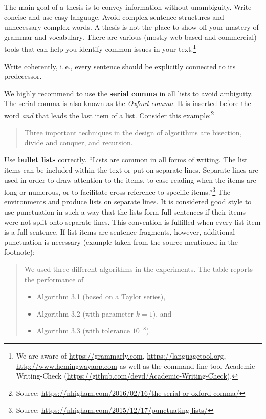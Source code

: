 The main goal of a thesis is to convey information without unambiguity. Write concise and use easy language. Avoid complex sentence structures and unnecessary complex words. A thesis is not the place to show off your mastery of grammar and vocabulary. There are various (mostly web-based and commercial) tools that can help you identify common issues in your text.\footnote{We are aware of \url{https://grammarly.com}, \url{https://languagetool.org}, \url{http://www.hemingwayapp.com} as well as the command-line tool Academic-Writing-Check (\url{https://github.com/devd/Academic-Writing-Check}).}

Write coherently, i.\,e., every sentence should be explicitly connected to its predecessor.

We highly recommend to use the \textbf{serial comma} in all lists to avoid ambiguity. The serial comma is also known as the \emph{Oxford comma}. It is inserted before the word \emph{and} that leads the last item of a list. Consider this example:\footnote{Source: \url{https://nhigham.com/2016/02/16/the-serial-or-oxford-comma/}}
\begin{quote}
  Three important techniques in the design of algorithms are bisection, divide and conquer, and recursion.
\end{quote}

Use \textbf{bullet lists} correctly. ``Lists are common in all forms of writing. The list items can be included within the text or put on separate lines. Separate lines are used in order to draw attention to the items, to ease reading when the items are long or numerous, or to facilitate cross-reference to specific items.''\footnote{Source: \url{https://nhigham.com/2015/12/17/punctuating-lists/}} The environments  and  produce lists on separate lines. It is considered good style to use punctuation in such a way that the lists form full sentences if their items were not split onto separate lines. This convention is fulfilled when every list item is a full sentence. If list items are sentence fragments, however, additional punctuation is necessary (example taken from the source mentioned in the footnote):

\begin{quote}
  We used three different algorithms in the experiments. The table reports the performance of
\begin{itemize}
\item Algorithm 3.1 (based on a Taylor series),
\item Algorithm 3.2 (with parameter \(k = 1\)), and
\item Algorithm 3.3 (with tolerance \(10^{-8}\)).
\end{itemize}
\end{quote}

